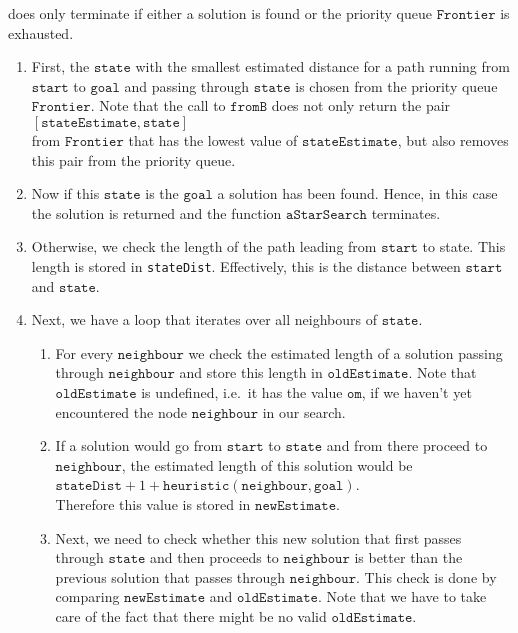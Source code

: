 does only terminate if either a solution is found or the priority queue $\mathtt{Frontier}$ is exhausted.
\begin{enumerate}
\item First, the $\mathtt{state}$ with the smallest estimated distance for a path running from $\mathtt{start}$
      to $\mathtt{goal}$ and passing through $\mathtt{state}$ is chosen from the priority queue
      $\mathtt{Frontier}$.  Note that the call to $\mathtt{fromB}$ does not only return the pair
      \\[0.2cm]
      \hspace*{1.3cm}
      $[\mathtt{stateEstimate}, \mathtt{state}]$
      \\[0.2cm]
      from $\mathtt{Frontier}$ that has the lowest value of $\mathtt{stateEstimate}$, but also removes this
      pair from the priority queue.
\item Now if this $\mathtt{state}$ is the $\mathtt{goal}$ a solution has been found.  Hence, in this case the solution is returned 
      and the function $\mathtt{aStarSearch}$ terminates.
\item Otherwise, we check the length of the path leading from $\mathtt{start}$ to state.  This length is stored in 
      \texttt{stateDist}.  Effectively, this is the distance between $\mathtt{start}$ and $\mathtt{state}$.
\item Next, we have a loop that iterates over all neighbours of $\mathtt{state}$.
      \begin{enumerate}
      \item For every $\mathtt{neighbour}$ we check the estimated length of a solution passing through
            $\mathtt{neighbour}$ and store this length in $\mathtt{oldEstimate}$.   Note that
            $\mathtt{oldEstimate}$ is undefined, i.e.~it has the value $\mathtt{om}$, if we haven't yet encountered the node
            $\mathtt{neighbour}$ in our search.
      \item If a solution would go from $\mathtt{start}$ to $\mathtt{state}$ and from there proceed to
            $\mathtt{neighbour}$, the estimated length of this solution would be
            \\[0.2cm]
            \hspace*{1.3cm}
            $\mathtt{stateDist} + 1 + \mathtt{heuristic}(\mathtt{neighbour}, \mathtt{goal})$.
            \\[0.2cm]
            Therefore this value is stored in $\mathtt{newEstimate}$.  
      \item Next, we need to check whether this new solution that first passes through $\mathtt{state}$ and
            then proceeds to $\mathtt{neighbour}$ is better than the previous solution that passes through
            $\mathtt{neighbour}$.  This check is done by comparing $\mathtt{newEstimate}$ and
            $\mathtt{oldEstimate}$.  Note that we have to take care of the fact that there might be no valid
            $\mathtt{oldEstimate}$.


\end{enumerate}
\end{enumerate}
